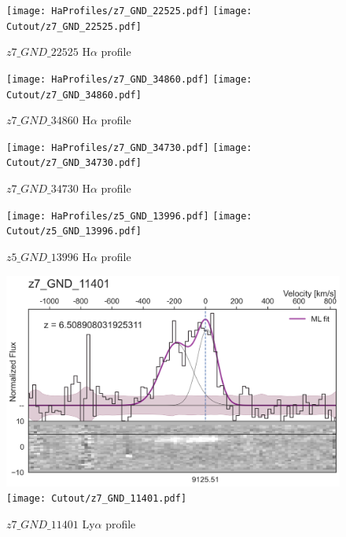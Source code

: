\documentclass[12pt,english]{article}
\begin{document}
\clearpage
\begin{figure}
\begin{center}\texttt{[image: HaProfiles/z7\_GND\_22525.pdf]}
\texttt{[image: Cutout/z7\_GND\_22525.pdf]}
\caption{$z7\_GND\_22525$ H$\alpha$ profile}
\end{center}
\end{figure}
\clearpage
\begin{figure}
\begin{center}\texttt{[image: HaProfiles/z7\_GND\_34860.pdf]}
\texttt{[image: Cutout/z7\_GND\_34860.pdf]}
\caption{$z7\_GND\_34860$ H$\alpha$ profile}
\end{center}
\end{figure}
\clearpage
\begin{figure}
\begin{center}\texttt{[image: HaProfiles/z7\_GND\_34730.pdf]}
\texttt{[image: Cutout/z7\_GND\_34730.pdf]}
\caption{$z7\_GND\_34730$ H$\alpha$ profile}
\end{center}
\end{figure}
\clearpage
\begin{figure}
\begin{center}\texttt{[image: HaProfiles/z5\_GND\_13996.pdf]}
\texttt{[image: Cutout/z5\_GND\_13996.pdf]}
\caption{$z5\_GND\_13996$ H$\alpha$ profile}
\end{center}
\end{figure}
\clearpage
\begin{figure}
\begin{center}\includegraphics[width=12cm, trim=0.1cm 0cm 0cm -1cm]{LyaProfiles/z7_GND_11401.png}
\texttt{[image: Cutout/z7\_GND\_11401.pdf]}
\caption{$z7\_GND\_11401$ Ly$\alpha$ profile}
\end{center}
\end{figure}
\clearpage
\end{document}
